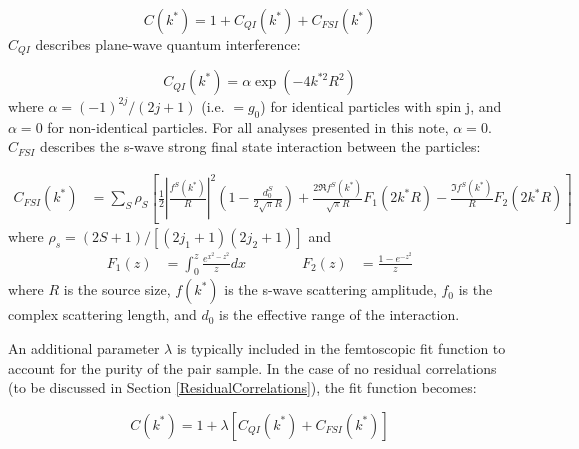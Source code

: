 \documentclass[/home/jesse/Analysis/FemtoAnalysis/AnalysisNotes/AnalysisNoteJBuxton.tex]{subfiles}
\begin{document}
\begin{equation}
 C(k^{*}) = 1 + C_{QI}(k^{*}) + C_{FSI}(k^{*})
\label{eqn:LednickyEqn}
\end{equation}
$C_{QI}$ describes plane-wave quantum interference:

\begin{equation}
 C_{QI}(k^{*}) = \alpha\exp(-4k^{*2}R^{2})
\label{eqn:CQI}
\end{equation}
where $\alpha = (-1)^{2j}/(2j+1)$ (i.e. $= g_{0}$) for identical particles with spin j, and $\alpha = 0$ for non-identical particles.  For all analyses presented in this note, $\alpha = 0$.  $C_{FSI}$ describes the s-wave strong final state interaction between the particles:

\begin{equation}
\begin{aligned}
C_{FSI}(k^{*}) &= \sum_{S}\rho_{S}\left[\frac{1}{2}\left|\frac{f^{S}(k^{*})}{R}\right|^2\left(1-\frac{d^{S}_{0}}{2\sqrt{\pi}R}\right)+\frac{2\Re f^{S}(k^{*})}{\sqrt{\pi}R}F_{1}(2k^{*}R)-\frac{\Im f^{S}(k^{*})}{R}F_{2}(2k^{*}R)\right]
\end{aligned}  
\label{eqn:CFSI}
\end{equation}
where $\rho_{s} = (2S+1)/[(2j_{1}+1)(2j_{2}+1)]$ and
\begin{equation}
\begin{aligned}
F_{1}(z) &= \int_{0}^{z} \frac{e^{x^{2}-z^{2}}}{z}dx \qquad \qquad F_{2}(z) &= \frac{1-e^{-z^{2}}}{z}
\end{aligned}  
\label{eqn:CFSI2}
\end{equation}
where $R$ is the source size, $f(k^{*})$ is the s-wave scattering amplitude, $f_{0}$ is the complex scattering length, and $d_{0}$ is the effective range of the interaction.

An additional parameter $\lambda$ is typically included in the femtoscopic fit function to account for the purity of the pair sample.  In the case of no residual correlations (to be discussed in Section \ref{ResidualCorrelations}), the fit function becomes:

\begin{equation}
 C(k^{*}) = 1 + \lambda[C_{QI}(k^{*}) + C_{FSI}(k^{*})]
\label{eqn:LednickyEqnwLambda}
\end{equation}

\end{document}

